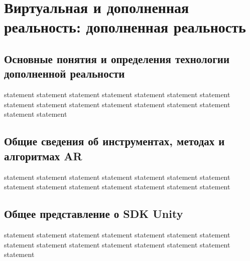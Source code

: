 \chapter{Виртуальная и дополненная реальность: дополненная реальность}

\section{Основные понятия и определения технологии дополненной реальности}

{statement}
{statement}
{statement}
{statement}
{statement}
{statement}
{statement}
{statement}
{statement}
{statement}
{statement}
{statement}
{statement}
{statement}
{statement}
{statement}

\section{Общие сведения об инструментах, методах и алгоритмах AR}

{statement}
{statement}
{statement}
{statement}
{statement}
{statement}
{statement}
{statement}
{statement}
{statement}
{statement}
{statement}
{statement}
{statement}

\section{Общее представление о SDK Unity}

{statement}
{statement}
{statement}
{statement}
{statement}
{statement}
{statement}
{statement}
{statement}
{statement}
{statement}
{statement}
{statement}
{statement}
{statement}

